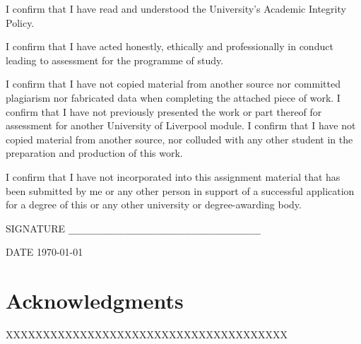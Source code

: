 \documentclass[a4paper,11pt]{report}
\begin{document}
I confirm that I have read and understood the University's Academic Integrity Policy.

I confirm that I have acted honestly, ethically and professionally in conduct leading
to assessment for the programme of study.  

I confirm that I have not copied material from another source nor committed plagiarism
nor fabricated data when completing the attached piece of work.  I confirm that I have 
not previously presented the work or part thereof for assessment for another University
of Liverpool module.  I confirm that I have not copied material from another source, nor
colluded with any other student in the preparation and production of this work.  

I confirm that I have not incorporated into this assignment material that has been 
submitted by me or any other person in support of a successful application for a 
degree of this or any other university or degree-awarding body.  

\vspace*{1in}

\noindent SIGNATURE \verb!______________________________________!

\noindent DATE \hspace*{.4in}  \today

\vspace*{1in}




\newpage


\chapter*{\center Acknowledgments}

XXXXXXXXXXXXXXXXXXXXXXXXXXXXXXXXXXXXXX
\end{document}
